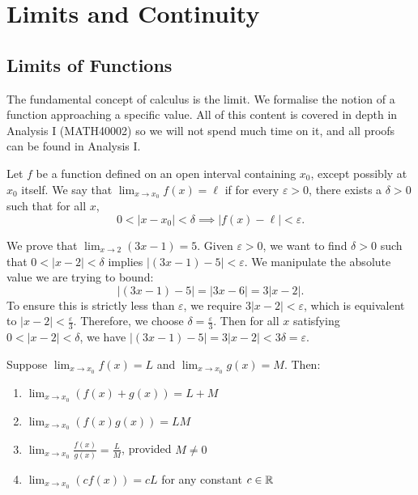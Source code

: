 \documentclass[../calculus.tex]{subfiles}
\begin{document}
\chapter{Limits and Continuity}


\section{Limits of Functions}

The fundamental concept of calculus is the limit. We formalise the notion of a function approaching a specific value. All of this content is covered in depth in Analysis I (MATH40002) so we will not spend much time on it, and all proofs can be found in Analysis I.

\begin{definition}
    \begin{shaded*}
    Let $f$ be a function defined on an open interval containing $x_0$, except possibly at $x_0$ itself. We say that $\lim_{x\to x_0}f(x)=\ell$ if for every $\varepsilon>0$, there exists a $\delta>0$ such that for all $x$, 
    \[0<|x-x_0|<\delta \implies |f(x)-\ell|<\varepsilon.\]
    \end{shaded*}
\end{definition}

\begin{example}
    We prove that $\lim_{x\to 2}(3x-1)=5$. Given $\varepsilon>0$, we want to find $\delta>0$ such that $0<|x-2|<\delta$ implies $|(3x-1)-5|<\varepsilon$. We manipulate the absolute value we are trying to bound:
    $$|(3x-1)-5| = |3x-6| = 3|x-2|.$$
    To ensure this is strictly less than $\varepsilon$, we require $3|x-2|<\varepsilon$, which is equivalent to $|x-2|<\frac{\varepsilon}{3}$. Therefore, we choose $\delta = \frac{\varepsilon}{3}$. Then for all $x$ satisfying $0<|x-2|<\delta$, we have $|(3x-1)-5| = 3|x-2| < 3\delta = \varepsilon$.
\end{example}

\begin{theorem}
    \begin{shaded*}
        Suppose $\lim_{x\to x_0}f(x)=L$ and $\lim_{x\to x_0}g(x)=M$. Then:
        \begin{enumerate}
            \item $\lim_{x\to x_0} (f(x)+g(x)) = L+M$
            \item $\lim_{x\to x_0} (f(x)g(x)) = LM$
            \item $\lim_{x\to x_0} \frac{f(x)}{g(x)} = \frac{L}{M}$, provided $M \neq 0$
            \item $\lim_{x\to x_0} (cf(x)) = cL$ for any constant $c\in\mathbb{R}$
        \end{enumerate}
    \end{shaded*}
\end{theorem}
\end{document}
